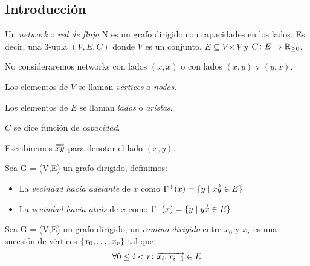 \subsection{Introducción}

\begin{definition}
  Un \emph{network} o \emph{red de flujo}  N es un grafo dirigido con capacidades
  en los lados. Es decir, una $3$-upla $(V, E, C)$ donde $V$ es un conjunto,
  $E \subseteq V \times V$ y $C \colon E \to \mathbb{R}_{\ge 0}$.

  No consideraremos networks con lados $(x,x)$ o con lados $(x,y)$ y $(y,x)$.
\end{definition}

\begin{notation}

  Los elementos de $V$ se llaman \emph{vértices} o \emph{nodos}.

  Los elementos de $E$ se llaman \emph{lados} o \emph{aristas}.

  $C$ se dice función de \emph{capacidad}.

  Escribiremos $\overrightarrow{xy}$ para denotar el lado $(x,y)$.
\end{notation}

\begin{definition}
  Sea G = (V,E) un grafo dirigido, definimos:
  \begin{itemize}
  \item La \emph{vecindad hacia adelante} de $x$ como
    $\Gamma^{+}(x) = \{y\mid \overrightarrow{xy} \in E\}$
  \item La \emph{vecindad hacia atrás} de $x$ como
    $\Gamma^{-}(x) = \{y\mid \overrightarrow{yx} \in E\}$
  \end{itemize}
\end{definition}

\begin{definition}
  Sea G = (V,E) un grafo dirigido, un \emph{camino dirigido} entre $x_0$ y $x_r$
  es una sucesión de vértices $\{x_0,\mathellipsis, x_r\}$ tal que
  \begin{align}
    \forall 0 \le i < r \colon \overrightarrow{x_i,x_{i+1}} \in E
  \end{align}
\end{definition}

